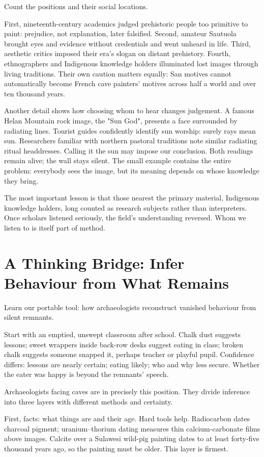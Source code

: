 Count the positions and their social locations.

First, nineteenth-century academics judged prehistoric people too primitive to paint: prejudice, not explanation, later falsified. Second, amateur Sautuola brought eyes and evidence without credentials and went unheard in life. Third, aesthetic critics imposed their era's slogan on distant prehistory. Fourth, ethnographers and Indigenous knowledge holders illuminated lost images through living traditions. Their own caution matters equally: San motives cannot automatically become French cave painters' motives across half a world and over ten thousand years.

Another detail shows how choosing whom to hear changes judgement. A famous Helan Mountain rock image, the "Sun God", presents a face surrounded by radiating lines. Tourist guides confidently identify sun worship: surely rays mean sun. Researchers familiar with northern pastoral traditions note similar radiating ritual headdresses. Calling it the sun may impose our conclusion. Both readings remain alive; the wall stays silent. The small example contains the entire problem: everybody sees the image, but its meaning depends on whose knowledge they bring.

The most important lesson is that those nearest the primary material, Indigenous knowledge holders, long counted as research subjects rather than interpreters. Once scholars listened seriously, the field's understanding reversed. Whom we listen to is itself part of method.

\section[Thinking Bridge: Remains to Behaviour]{A Thinking Bridge: Infer Behaviour from What Remains}
Learn our portable tool: how archaeologists reconstruct vanished behaviour from silent remnants.

Start with an emptied, unswept classroom after school. Chalk dust suggests lessons; sweet wrappers inside back-row desks suggest eating in class; broken chalk suggests someone snapped it, perhaps teacher or playful pupil. Confidence differs: lessons are nearly certain; eating likely; who and why less secure. Whether the eater was happy is beyond the remnants' speech.

Archaeologists facing caves are in precisely this position. They divide inference into three layers with different methods and certainty.

First, facts: what things are and their age. Hard tools help. Radiocarbon dates charcoal pigment; uranium--thorium dating measures thin calcium-carbonate films above images. Calcite over a Sulawesi wild-pig painting dates to at least forty-five thousand years ago, so the painting must be older. This layer is firmest.

